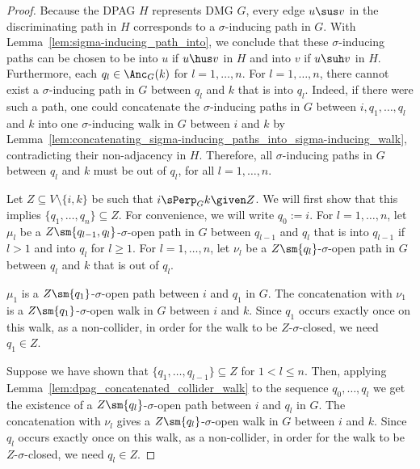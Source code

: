 \begin{proof}
  Because the DPAG $H$ represents DMG $G$, every edge $u \sus v$ in the discriminating path in $H$ corresponds to a $\sigma$-inducing path in $G$. %
  With Lemma~\ref{lem:sigma-inducing_path_into}, we conclude that these $\sigma$-inducing paths can be chosen to be into $u$ if $u \hus v$ in $H$ and into $v$ if $u \suh v$ in $H$. 
  Furthermore, each $q_l \in \Anc_G(k)$ for $l = 1,\dots,n$. 
  For $l=1,\dots,n$, there cannot exist a $\sigma$-inducing path in $G$ between $q_l$ and $k$ that is into $q_l$.
  Indeed, if there were such a path, one could concatenate the $\sigma$-inducing paths in $G$ between $i, q_1, \dots, q_l$ and $k$ into one $\sigma$-inducing walk in $G$ between $i$ and $k$ by Lemma~\ref{lem:concatenating_sigma-inducing_paths_into_sigma-inducing_walk}, contradicting their non-adjacency in $H$.
  Therefore, all $\sigma$-inducing paths in $G$ between $q_l$ and $k$ must be out of $q_l$, for all $l=1,\dots,n$.

  Let $Z \subseteq V \setminus \{i,k\}$ be such that $i \sPerp_G k \given Z$.
  We will first show that this implies $\{q_1,\dots,q_n\} \subseteq Z$.
  For convenience, we will write $q_0 := i$.
  For $l=1,\dots,n$, let $\mu_l$ be a $Z\sm\{q_{l-1},q_{l}\}$-$\sigma$-open path in $G$ between $q_{l-1}$ and $q_l$ that is into $q_{l-1}$ if $l > 1$ and into $q_l$ for $l \ge 1$.
  For $l=1,\dots,n$, let $\nu_l$ be a $Z\sm\{q_l\}$-$\sigma$-open path in $G$ between $q_l$ and $k$ that is out of $q_l$.

  $\mu_1$ is a $Z\sm\{q_1\}$-$\sigma$-open path between $i$ and $q_1$ in $G$.
  The concatenation with $\nu_1$ is a $Z\sm\{q_1\}$-$\sigma$-open walk in $G$ between $i$ and $k$.
  Since $q_1$ occurs exactly once on this walk, as a non-collider, in order for the walk to be $Z$-$\sigma$-closed, we need $q_1 \in Z$.
  
  Suppose we have shown that $\{q_1,\dots,q_{l-1}\} \subseteq Z$ for $1 < l \le n$. Then,
  applying Lemma~\ref{lem:dpag_concatenated_collider_walk} to the sequence $q_0,\dots,q_l$ we get the existence of a $Z\sm\{q_l\}$-$\sigma$-open path between $i$ and $q_l$ in $G$.
  The concatenation with $\nu_l$ gives a $Z\sm\{q_l\}$-$\sigma$-open walk in $G$ between $i$ and $k$.
  Since $q_l$ occurs exactly once on this walk, as a non-collider, in order for the walk to be $Z$-$\sigma$-closed, we need $q_l \in Z$.


\end{proof}
